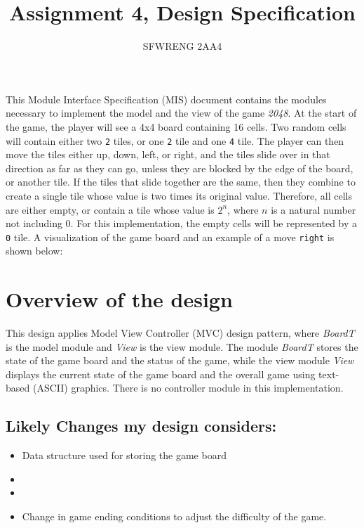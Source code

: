 \documentclass[12pt]{article}
\title{Assignment 4, Design Specification}
\author{SFWRENG 2AA4}
\begin{document}
\maketitle
This Module Interface Specification (MIS) document contains the modules necessary to implement the model and the view of the game \textit{2048}. At the start of the game, the player will see a 4x4 board containing 16 cells. Two random cells will contain either two \texttt{2} tiles, or one \texttt{2} tile and one \texttt{4} tile. The player can then move the tiles either up, down, left, or right, and the tiles slide over in that direction as far as they can go, unless they are blocked by the edge of the board, or another tile. If the tiles that slide together are the same, then they combine to create a single tile whose value is two times its original value. Therefore, all cells are either empty, or contain a tile whose value is $2^n$, where $n$ is a natural number not including $0$. For this implementation, the empty cells will be represented by a \texttt{0} tile. A visualization of the game board and an example of a move \texttt{right} is shown below:



\newpage

\section{Overview of the design}

This design applies Model View Controller (MVC) design pattern, where \textit{BoardT} is the model module and \textit{View} is the view module. The module \textit{BoardT} stores the state of the game board and the status of the game, while the view module \textit{View} displays the current state of the game board and the overall game using text-based (ASCII) graphics. There is no controller module in this implementation.

\newpage

\subsection*{Likely Changes my design considers:}

\begin{itemize}
  \item Data structure used for storing the game board
  \item  
  \item 
  \item Change in game ending conditions to adjust the difficulty of the game.
\end{itemize}
\end{document}
